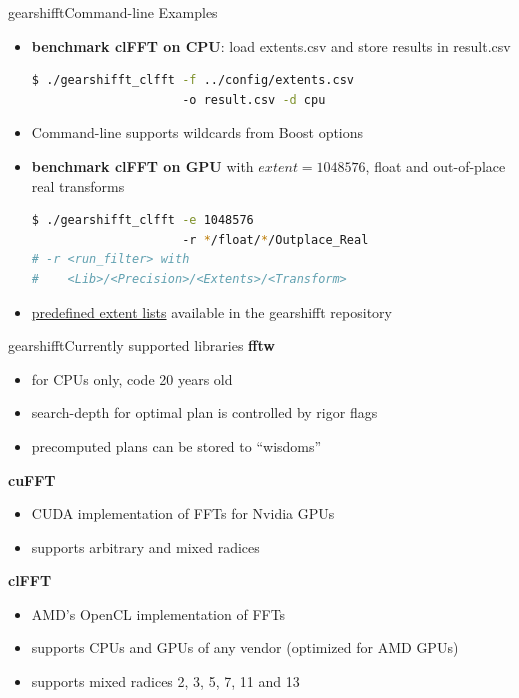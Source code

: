 \documentclass[t,11pt,hyperref={
  pdftitle = {gearshifft},
  pdfsubject = {gearshifft},
  pdfborder={0 0 0},
  colorlinks=true,
  urlcolor=red,
  citecolor=red,
  linkcolor=red,
  pdfauthor={Peter Steinbach, Matthias Werner}
  }
]{beamer}
\begin{document}
\begin{frame}[fragile]{gearshifft}{Command-line Examples}
  \begin{itemize}[<+->]
\item 
\textbf{benchmark clFFT on CPU}: load extents.csv and store results in result.csv
\begin{lstlisting}[numbers=none,language=bash]
$ ./gearshifft_clfft -f ../config/extents.csv
                     -o result.csv -d cpu
\end{lstlisting}

\item Command-line supports wildcards from Boost options
\item 
\textbf{benchmark clFFT on GPU} with $extent=1048576$, float and out-of-place real transforms
\begin{lstlisting}[numbers=none,language=bash]
$ ./gearshifft_clfft -e 1048576
                     -r */float/*/Outplace_Real
# -r <run_filter> with 
#    <Lib>/<Precision>/<Extents>/<Transform>
\end{lstlisting}
\item \href{https://github.com/mpicbg-scicomp/gearshifft/tree/master/config}{predefined extent lists} available in the gearshifft repository
\end{itemize}  
\end{frame}


\begin{frame}{gearshifft}{Currently supported libraries}
  {\textbf{fftw}}
  \begin{itemize}
  \item for CPUs only, code 20 years old
  \item search-depth for optimal plan is controlled by rigor flags
  \item precomputed plans can be stored to ``wisdoms''
  \end{itemize}
\pause  
  {\textbf{cuFFT}} 
  \begin{itemize}
  \item CUDA implementation of FFTs for Nvidia GPUs
  \item supports arbitrary and mixed radices
  \end{itemize}
\pause
  {\textbf{clFFT}}
  \begin{itemize}
  \item AMD's OpenCL implementation of FFTs
  \item supports CPUs and GPUs of any vendor (optimized for AMD GPUs)
  \item supports mixed radices 2, 3, 5, 7, 11 and 13
  \end{itemize}
  
\end{frame}
\end{document}
